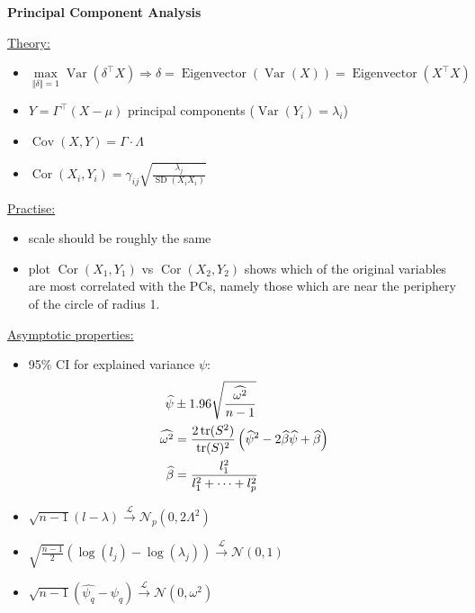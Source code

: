 \documentclass[10pt,landscape,a4paper]{article}
\DeclareMathOperator{\Var}{Var}
\DeclareMathOperator{\Cov}{Cov}
\DeclareMathOperator{\Cor}{Cor}
\DeclareMathOperator{\SD}{SD}
\DeclareMathOperator{\tr}{tr}
\DeclareMathOperator{\Eigenvector}{Eigenvector}
\begin{document}
\begin{multicols*}{4}
\begin{center}
	\normalsize{\textbf{Principal Component Analysis}} \\
\end{center}
\underline{Theory:}
\begin{itemize}
	\item $\max\limits_{\Vert \delta\Vert = 1} \Var(\delta^\top X) \Rightarrow \delta = \Eigenvector(\Var(X)) = \Eigenvector(X^\top X)$
	\item $Y = \Gamma^\top (X-\mu)$ principal components ($\Var(Y_i) = \lambda_i$)
	\item $\Cov(X,Y) = \Gamma\cdot \Lambda$
	\item $\Cor(X_i,Y_i) = \gamma_{ij}\sqrt{\frac{\lambda_j}{\SD(X_iX_i)}}$
\end{itemize}
\underline{Practise:}
\begin{itemize}
	\item scale should be roughly the same
	\item plot $\Cor(X_1,Y_1)$ vs $\Cor(X_2,Y_2)$ shows which of the original variables are most correlated with the PCs, namely those which are near the periphery of the circle of radius 1.
\end{itemize}
\underline{Asymptotic properties:}
\begin{itemize}
	\item 95\% CI for explained variance $\psi$:
	\begin{align}
		\widehat{\psi}&\pm 1.96\sqrt{\frac{\widehat{\omega^2}}{n-1}} \notag \\
		\widehat{\omega^2} &= \frac{2\tr(S^2)}{\tr(S)^2}\left(\widehat{\psi}^2 - 2\widehat{\beta}\widehat{\psi} + \widehat{\beta}\right) \notag \\
		\widehat{\beta} &= \frac{l_1^2}{l_1^2 + \dots + l_p^2} \notag
	\end{align}
	\item $\sqrt{n-1}(l-\lambda) \xrightarrow{\mathcal{L}}\mathcal{N}_p(0,2\Lambda^2)$
	\item $\sqrt{\frac{n-1}{2}}(\log(l_j)-\log(\lambda_j)) \xrightarrow{\mathcal{L}}\mathcal{N}(0,1)$
	\item $\sqrt{n-1}\left(\widehat{\psi_q} - \psi_q\right)\xrightarrow{\mathcal{L}}\mathcal{N}(0,\omega^2)$
\end{itemize}


\end{multicols*}
\end{document}
